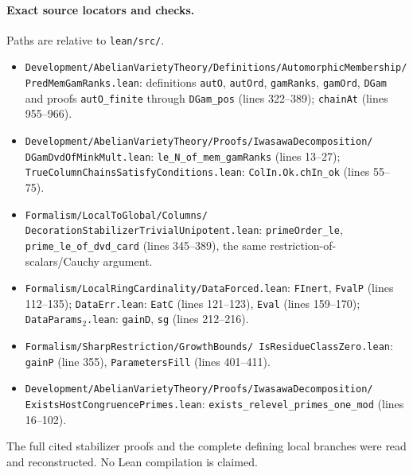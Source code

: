 \paragraph{Exact source locators and checks.}
Paths are relative to \texttt{lean/src/}.
\begin{itemize}
\item \texttt{Development/AbelianVarietyTheory/Definitions/AutomorphicMembership/
PredMemGamRanks.lean}: definitions \texttt{autO}, \texttt{autOrd},
\texttt{gamRanks}, \texttt{gamOrd}, \texttt{DGam} and proofs
\texttt{autO\_finite} through \texttt{DGam\_pos} (lines 322--389);
\texttt{chainAt} (lines 955--966).
\item \texttt{Development/AbelianVarietyTheory/Proofs/IwasawaDecomposition/
DGamDvdOfMinkMult.lean}: \texttt{le\_N\_of\_mem\_gamRanks}
(lines 13--27); \texttt{TrueColumnChainsSatisfyConditions.lean}:
\texttt{ColIn.Ok.chIn\_ok} (lines 55--75).
\item \texttt{Formalism/LocalToGlobal/Columns/
DecorationStabilizerTrivialUnipotent.lean}:
\texttt{primeOrder\_le}, \texttt{prime\_le\_of\_dvd\_card}
(lines 345--389), the same restriction-of-scalars/Cauchy argument.
\item \texttt{Formalism/LocalRingCardinality/DataForced.lean}:
\texttt{FInert}, \texttt{FvalP} (lines 112--135);
\texttt{DataErr.lean}: \texttt{EatC} (lines 121--123),
\texttt{Eval} (lines 159--170); \texttt{DataParams$_2$.lean}:
\texttt{gainD}, \texttt{sg} (lines 212--216).
\item \texttt{Formalism/SharpRestriction/GrowthBounds/
IsResidueClassZero.lean}: \texttt{gainP} (line 355),
\texttt{ParametersFill} (lines 401--411).
\item \texttt{Development/AbelianVarietyTheory/Proofs/IwasawaDecomposition/
ExistsHostCongruencePrimes.lean}:
\texttt{exists\_relevel\_primes\_one\_mod} (lines 16--102).
\end{itemize}
The full cited stabilizer proofs and the complete defining local
branches were read and reconstructed.  No Lean compilation is claimed.
